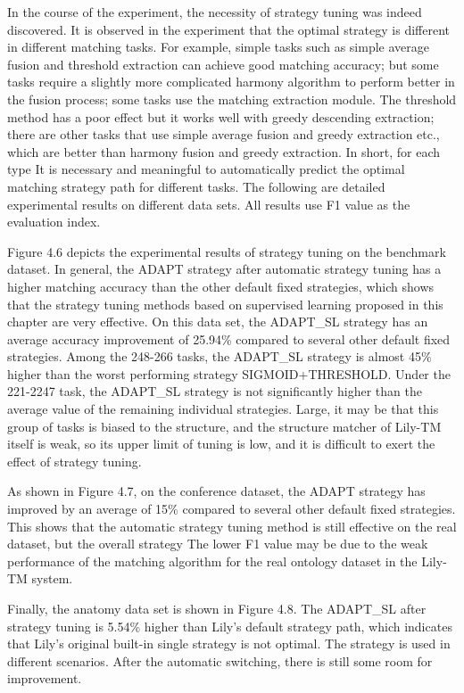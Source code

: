\documentclass[twoside]{article}
\begin{document}
\begin{multicols}{2}
In the course of the experiment, the necessity of strategy tuning was indeed discovered. 
It is observed in the experiment that the optimal strategy is different in different matching tasks. 
For example, simple tasks such as simple average fusion and threshold extraction can achieve good matching accuracy; but some tasks require a slightly more complicated harmony algorithm to perform better in the fusion process; some tasks use the matching extraction module. The threshold method has a poor effect but it works well with greedy descending extraction; there are other tasks that use simple average fusion and greedy extraction etc., which are better than harmony fusion and greedy extraction. 
In short, for each type It is necessary and meaningful to automatically predict the optimal matching strategy path for different tasks. 
The following are detailed experimental results on different data sets. All results use F1 value as the evaluation index.

Figure 4.6 depicts the experimental results of strategy tuning on the benchmark dataset. 
In general, the ADAPT strategy after automatic strategy tuning has a higher matching accuracy than the other default fixed strategies, which shows that the strategy tuning methods based on supervised learning proposed in this chapter are very effective.
On this data set, the ADAPT\_SL strategy has an average accuracy improvement of 25.94\% compared to several other default fixed strategies. 
Among the 248-266 tasks, the ADAPT\_SL strategy is almost 45\% higher than the worst performing strategy SIGMOID+THRESHOLD. 
Under the 221-2247 task, the ADAPT\_SL strategy is not significantly higher than the average value of the remaining individual strategies. Large, it may be that this group of tasks is biased to the structure, and the structure matcher of Lily-TM itself is weak, so its upper limit of tuning is low, and it is difficult to exert the effect of strategy tuning.

As shown in Figure 4.7, on the conference dataset, the ADAPT strategy has improved by an average of 15\% compared to several other default fixed strategies. This shows that the automatic strategy tuning method is still effective on the real dataset, but the overall strategy The lower F1 value may be due to the weak performance of the matching algorithm for the real ontology dataset in the Lily-TM system.

Finally, the anatomy data set is shown in Figure 4.8. The ADAPT\_SL after strategy tuning is 5.54\% higher than Lily's default strategy path, which indicates that Lily's original built-in single strategy is not optimal. The strategy is used in different scenarios. After the automatic switching, there is still some room for improvement.


\end{multicols}
\end{document}
